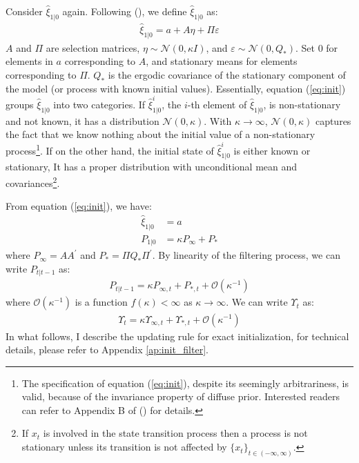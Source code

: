 \documentclass[10pt]{article}
\numberwithin{equation}{section}
\begin{document}
Consider $\hat{\xi}_{1|0}$ again. Following (\cite{koopman_1997}), we define $\hat{\xi}_{1|0}$ as:
\begin{align}
    \hat{\xi}_{1|0} = a + A\eta + \Pi\varepsilon \label{eq:init}
\end{align}
$A$ and $\Pi$ are selection matrices, $\eta\sim\mathcal{N}(0,\kappa I)$, and $\varepsilon\sim\mathcal{N}(0,Q_{*})$. Set $0$ for elements in $a$ corresponding to $A$, and stationary means for elements corresponding to $\Pi$. $Q_{*}$ is the ergodic covariance of the stationary component of the model (or process with known initial values). Essentially, equation (\ref{eq:init}) groups $\hat{\xi}_{1|0}$ into two categories. If $\hat{\xi}_{1|0}^i$, the $i$-th element of $\hat{\xi}_{1|0}$, is non-stationary and not known, it has a distribution $\mathcal{N}(0, \kappa)$. With $\kappa\rightarrow\infty$, $\mathcal{N}(0,\kappa)$ captures the fact that we know nothing about the initial value of a non-stationary process\footnote{The specification of equation (\ref{eq:init}), despite its seemingly arbitrariness, is valid, because of the invariance property of diffuse prior. Interested readers can refer to Appendix B of (\cite{doan_2010}) for details.}. If on the other hand, the initial state of $\hat{\xi}_{1|0}^i$ is either known or stationary, It has a proper distribution with unconditional mean and covariances\footnote{If $x_t$ is involved in the state transition process then a process is not stationary unless its transition is not affected by $\{x_t\}_{t\in(-\infty,\infty)}$.}. 

From equation (\ref{eq:init}), we have:
\begin{align}
    \hat{\xi}_{1|0} &= a  \label{eq:init_xi}\\
    P_{1|0} &= \kappa P_{\infty} + P_{*} \label{eq:init_P}
\end{align}
where $P_{\infty}=AA^{'}$ and $P_{*}=\Pi Q_* \Pi^{'}$. By linearity of the filtering process, we can write $P_{t|t-1}$ as:
\begin{align}
    P_{t|t-1} = \kappa P_{\infty,t} + P_{*,t} + \mathcal{O}(\kappa^{-1}) \label{eq:P_diffuse}
\end{align}
where $\mathcal{O}(\kappa^{-1})$ is a function $f(\kappa)<\infty$ as $\kappa\rightarrow\infty$. We can write $\Upsilon_{t}$ as:
\begin{align*}
    \Upsilon_t = \kappa\Upsilon_{\infty,t} + \Upsilon_{*,t} + \mathcal{O}(\kappa^{-1})
\end{align*}
In what follows, I describe the updating rule for exact initialization, for technical details, please refer to Appendix \ref{ap:init_filter}.
\end{document}
